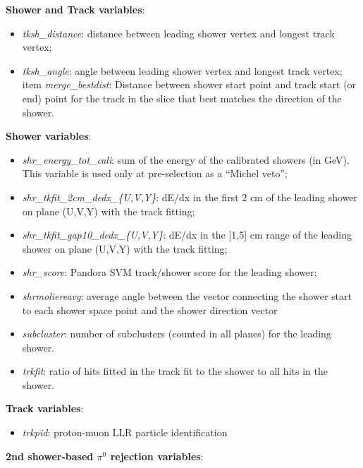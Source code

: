\par \noindent \textbf{Shower and Track variables}:

\begin{itemize}
    \item \emph{tksh\_distance}: distance between leading shower vertex and longest track vertex;
    \item \emph{tksh\_angle}: angle between leading shower vertex and longest track vertex;
    item \emph{merge\_bestdist}: Distance between shower start point and track start (or end) point for the track in the slice that best matches the direction of the shower. 
\end{itemize}

\par \noindent \textbf{Shower variables}:

\begin{itemize}
    \item \emph{shr\_energy\_tot\_cali}: sum of the energy of the calibrated showers (in GeV). This variable is used only at pre-selection as a ``Michel veto'';
    \item \emph{shr\_tkfit\_2cm\_dedx\_\{U,V,Y\}}: dE/dx in the first 2 cm of the leading shower on plane (U,V,Y) with the track fitting;
    \item \emph{shr\_tkfit\_gap10\_dedx\_\{U,V,Y\}}: dE/dx in the [1,5] cm range of the leading shower on plane (U,V,Y) with the track fitting;
    \item \emph{shr\_score}: Pandora SVM track/shower score for the leading shower;
    \item \emph{shrmoliereavg}: average angle between the vector connecting the shower start to each shower space point and the shower direction vector
    \item \emph{subcluster}: number of subclusters (counted in all planes) for the leading shower.
    \item \emph{trkfit}: ratio of hits fitted in the track fit to the shower to all hits in the shower.
\end{itemize}

\par \noindent  \textbf{Track variables}:

\begin{itemize}
    \item \emph{trkpid}: proton-muon LLR particle identification 
\end{itemize}

\par \noindent  \textbf{2nd shower-based $\pi^0$ rejection variables}:


